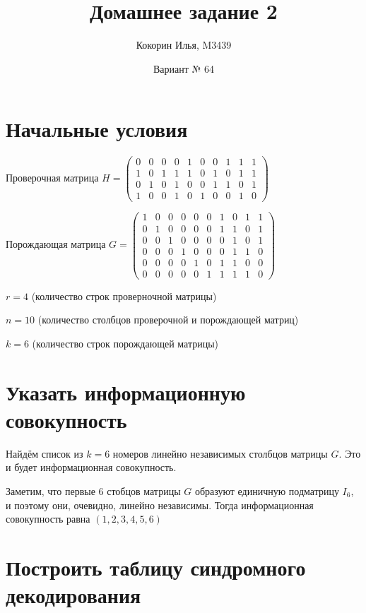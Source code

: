 \documentclass{article}
\title{Домашнее задание 2}
\author{Кокорин Илья, M3439}
\date{Вариант № 64}
\begin{document}
	\maketitle
	\section{Начальные условия}
	Проверочная матрица
	$
	H = \left(
	\begin{array}{cccccccccc}
	0 & 0 & 0 & 0 & 1 & 0 & 0 & 1 & 1 & 1\\
	1 & 0 & 1 & 1 & 1 & 0 & 1 & 0 & 1 & 1\\
	0 & 1 & 0 & 1 & 0 & 0 & 1 & 1 & 0 & 1\\
	1 & 0 & 0 & 1 & 0 & 1 & 0 & 0 & 1 & 0
	\end{array}
	\right)
	$
	
	Порождающая матрица
	$
	G = \left(
	\begin{array}{cccccccccc}
	1& 0& 0& 0& 0& 0   & 1& 0& 1& 1  \\
	0& 1& 0& 0& 0& 0   & 1& 1& 0& 1  \\
	0 &0 &1 &0 &0 &0   & 0 &1 &0 &1 \\ 
	0 &0 &0 &1 &0 &0   & 0 &1 &1 &0 \\
	0 &0 &0 &0 &1 &0   & 1 &1 &0 &0  \\
	0 &0 &0 &0 &0 &1  & 1 &1 &1 &0 
	\end{array}
	\right)
	$
	
	$r = 4$ (количество строк проверночной матрицы)
	
	$n = 10$ (количество столбцов проверочной и порождающей матриц)
	
	$ k = 6$ (количество строк порождающей матрицы)
	
	\section{Указать информационную совокупность}
	
	Найдём список из $k = 6$ номеров линейно независимых столбцов матрицы $G$. Это и будет информационная совокупность.
	
	Заметим, что первые 6 стобцов матрицы $G$ образуют единичную подматрицу $I_6$, и поэтому они, очевидно, линейно независимы. Тогда информационная совокупность равна $(1, 2, 3, 4, 5, 6)$
	
	\section{Построить таблицу синдромного декодирования}
	
\end{document}
